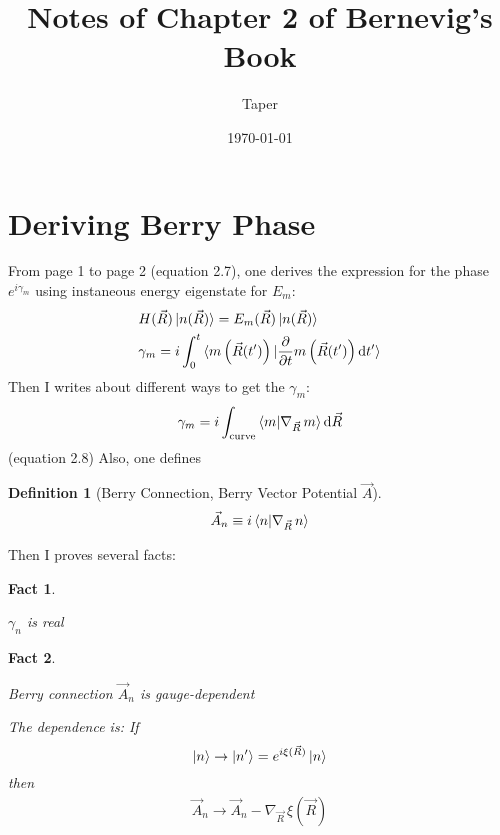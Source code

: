 \documentclass{article}
\title{Notes of Chapter 2 of Bernevig's Book}
\date{\today}
\author{Taper}
\newcommand*\diff{\mathop{}\!\mathrm{d}}
\numberwithin{equation}{subsection} %
\newtheorem{defi}{Definition}[section]
\newtheorem{fact}{Fact}[section]
\theoremstyle{definition}
\begin{document}
\maketitle
{}
\tableofcontents

\section{Deriving Berry Phase}
\label{sec:Deriving-Berry-Phase}
From page 1 to page 2 (equation 2.7), one derives the expression for
the phase $e^{i\gamma_m}$ using instaneous energy eigenstate for
$E_m$:
\begin{align}
    & H(\vec{R})\ket{n(\vec{R})} = E_m(\vec{R})\ket{n(\vec{R})} \\
    & \gamma_m = i\int_0^t
    \braket{
        m\left(\vec{R}(t')\right)|\frac{\partial }{\partial t}
        m\left(\vec{R}(t')\right) \diff t' }
\end{align}
Then I writes about different ways to get the $\gamma_m$:
\begin{align}
    \gamma_m = i\int_{\text{curve}}\braket{m|\nabla_{\vec{R}}\, m }
    \diff \vec{R}
\end{align}
(equation 2.8) 
Also, one defines
\begin{defi}[Berry Connection, Berry Vector Potential $\vec{A}$]
    \begin{align}
        \vec{A}_n \equiv i \braket{n|\nabla_{\vec{R}}\, n }
    \end{align}
\end{defi}
Then I proves several facts:
\begin{fact}
    \label{fact:gamma_is_real}
    $  $
    \begin{center}
        $\gamma_n$ is real
    \end{center}
\end{fact}
\begin{fact}
    $ $
    \begin{center}
        Berry connection $\vec{A}_n$ is gauge-dependent 
    \end{center}
    The dependence is: If 
    $$\ket{n}\to \ket{n'}= e^{i\xi(\vec{R})}\ket{n}$$
    then
    \begin{align}
        \vec{A}_n \to \vec{A}_n - \nabla_{\vec{R}}\,\xi(\vec{R})
    \end{align}
\end{fact}
\end{document}
